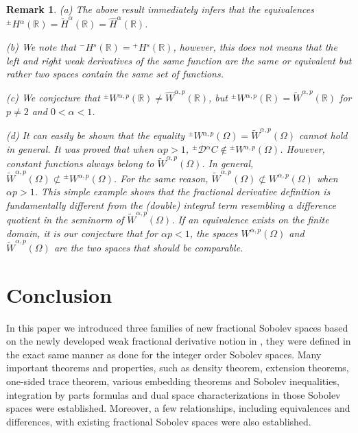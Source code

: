 \documentclass[leqno,final]{siamltex}
\numberwithin{equation}{section}
\newtheorem{remark}{Remark}[section]
\renewcommand{\(}{\bigl(}
\renewcommand{\)}{\bigr)}
\newcommand{\tW}{\widetilde{W}}
\newcommand{\R}{\mathbb{R}}
\begin{document}
  \begin{remark}
        (a) The above result immediately infers that the equivalences \newline 
         ${^{\pm}}{H}{^{\alpha}}(\R) = \widetilde{H}^{\alpha}(\R) = \widehat{H}^{\alpha}(\R)$.
        
      (b) We note that  ${^{-}}{{H}}{^{s}} (\R) = {^{+}}{{H}}{^{s}} (\R)$, 
          however, this does not means 
        that the left and right weak derivatives of the same function are the same 
        or equivalent but rather two spaces contain the same set of functions. 
    
      (c) We conjecture that ${^{\pm}}{W}{^{\alpha,p}}(\R) \neq \widehat{W}^{\alpha,p}(\R)$, but 
      ${^{\pm}}{W}{^{\alpha,p}}(\R) = {\tW}^{\alpha,p}(\R)$ for $p\neq2$ and $0<\alpha<1$.
      
      (d) It can easily be shown that the equality ${^{\pm}}{W}{^{\alpha,p}}(\Omega) = {\tW}^{\alpha,p}(\Omega)$ cannot hold in general. It was proved that when $\alpha p > 1$, ${^{\pm}}{\mathcal{D}}{^{\alpha}} C \notin {^{\pm}}{W}{^{\alpha,p}}(\Omega)$. However, constant functions always belong to ${\tW}^{\alpha,p}(\Omega)$. In general, ${\tW}^{\alpha,p}(\Omega) \not\subset {^{\pm}}{W}{^{\alpha,p}}(\Omega)$. For the same reason, ${\tW}^{\alpha,p}(\Omega) \not\subset  {W}^{\alpha,p}(\Omega)$ when $\alpha p >1$. This simple example shows that the fractional derivative definition is fundamentally different from the (double) integral term resembling a difference quotient in the seminorm of ${\tW}^{\alpha,p}(\Omega)$. If an equivalence exists on the finite domain, it is our conjecture that for $\alpha p <1$, the spaces $ {W}^{\alpha , p}(\Omega)$ and ${\tW}^{\alpha,p}(\Omega)$ are the two spaces that should be comparable. 
      
  \end{remark}
 
   

\section{Conclusion}\label{sec-5}
   In this paper we introduced three families of new fractional Sobolev
   spaces based on the newly developed weak fractional derivative 
   notion in \cite{Feng_Sutton, Feng_Sutton1}, they were defined in the exact same manner 
   as done for the integer order Sobolev spaces. Many important theorems and properties,
    such as density theorem, extension theorems, one-sided trace theorem, various embedding 
    theorems and Sobolev inequalities, integration by parts formulas and dual space 
    characterizations in those Sobolev spaces were established. 
    Moreover, a few relationships, including equivalences and differences, with existing 
   fractional Sobolev spaces were also established.
   
\end{document}
